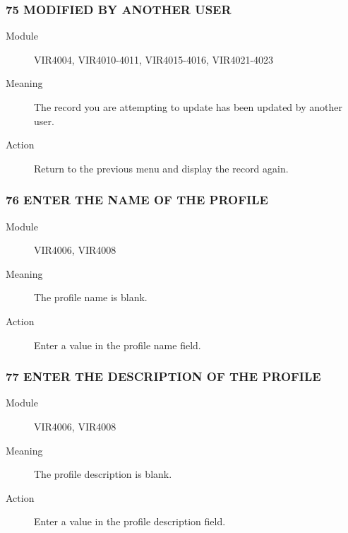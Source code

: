 \documentclass[letterpaper,10pt,english]{sphinxmanual}
\begin{document}
\subsubsection{75 MODIFIED BY ANOTHER USER}
\label{\detokenize{messages:modified-by-another-user}}\begin{description}
\item[{Module}] \leavevmode
VIR4004, VIR4010-4011, VIR4015-4016, VIR4021-4023

\item[{Meaning}] \leavevmode
The record you are attempting to update has been updated by another user.

\item[{Action}] \leavevmode
Return to the previous menu and display the record again.

\end{description}


\subsubsection{76 ENTER THE NAME OF THE PROFILE}
\label{\detokenize{messages:enter-the-name-of-the-profile}}\begin{description}
\item[{Module}] \leavevmode
VIR4006, VIR4008

\item[{Meaning}] \leavevmode
The profile name is blank.

\item[{Action}] \leavevmode
Enter a value in the profile name field.

\end{description}


\subsubsection{77 ENTER THE DESCRIPTION OF THE PROFILE}
\label{\detokenize{messages:enter-the-description-of-the-profile}}\begin{description}
\item[{Module}] \leavevmode
VIR4006, VIR4008

\item[{Meaning}] \leavevmode
The profile description is blank.

\item[{Action}] \leavevmode
Enter a value in the profile description field.

\end{description}
\end{document}
